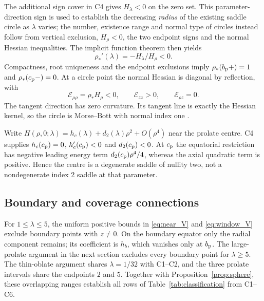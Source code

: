 The additional sign cover in C4 gives $H_\lambda<0$ on the zero set.
This parameter-direction sign is used to establish the decreasing
\emph{radius} of the existing saddle circle as $\lambda$ varies; the
number, existence range and normal type of circles instead follow from
vertical exclusion, $H_\rho<0$, the two endpoint signs and the normal
Hessian inequalities. The implicit function theorem then yields
\begin{equation}\label{eq:branch_slope}
 \rho_*'(\lambda)=-H_\lambda/H_\rho<0.
\end{equation}
Compactness, root uniqueness and the endpoint exclusions imply $\rho_*(b_{\mathrm p}+)=1$ and $\rho_*(c_{\mathrm p}-)=0$. At a circle point the normal Hessian is diagonal by reflection, with
\[
 \mathcal E_{\rho\rho}=\rho_*H_\rho<0,\qquad \mathcal E_{zz}>0,
 \qquad \mathcal E_{\rho z}=0.
\]
The tangent direction has zero curvature. Its tangent line is exactly the Hessian kernel, so the circle is Morse--Bott with normal index one \citep{Bott1954}.

Write $H(\rho,0;\lambda)=h_c(\lambda)+d_2(\lambda)\rho^2+O(\rho^4)$ near the prolate centre. C4 supplies $h_c(c_{\mathrm p})=0$, $h_c'(c_{\mathrm p})<0$ and $d_2(c_{\mathrm p})<0$. At $c_{\mathrm p}$ the equatorial restriction has negative leading energy term $d_2(c_{\mathrm p})\rho^4/4$, whereas the axial quadratic term is positive. Hence the centre is a degenerate saddle of nullity two, not a nondegenerate index 2 saddle at that parameter.



\subsection{Boundary and coverage connections}
For $1\le\lambda\le5$, the uniform positive bounds in \eqref{eq:near_V} and \eqref{eq:window_V} exclude boundary points with $z\ne0$. On the boundary equator only the radial component remains; its coefficient is $h_b$, which vanishes only at $b_{\mathrm p}$. The large-prolate argument in the next section excludes every boundary point for $\lambda\ge5$. The thin-oblate argument shares $\lambda=1/32$ with C1--C2, and the three prolate intervals share the endpoints $2$ and $5$. Together with Proposition~\ref{prop:sphere}, these overlapping ranges establish all rows of Table~\ref{tab:classification} from C1--C6.
